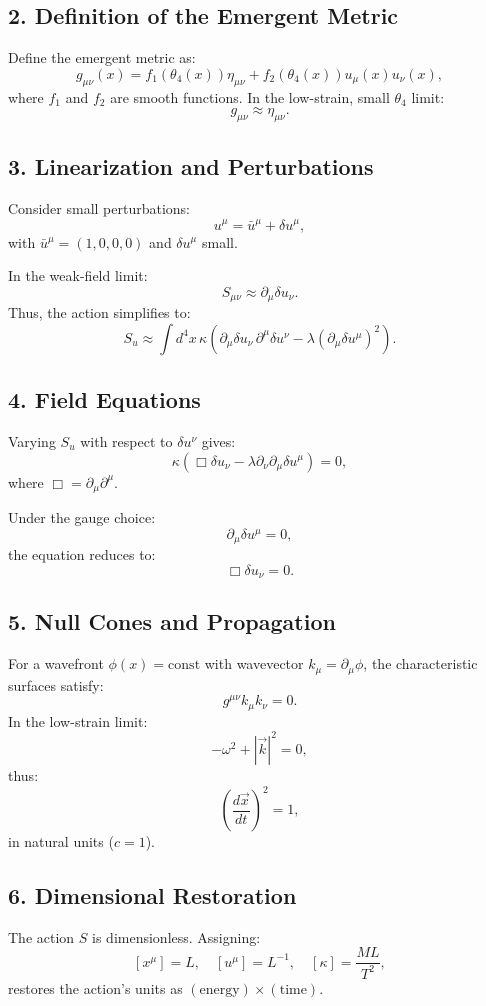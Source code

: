 \documentclass[12pt]{article}
\begin{document}
\subsection*{2. Definition of the Emergent Metric}
Define the emergent metric as:
\[
g_{\mu\nu}(x) = f_1(\theta_4(x)) \eta_{\mu\nu} + f_2(\theta_4(x)) u_\mu(x) u_\nu(x),
\]
where \(f_1\) and \(f_2\) are smooth functions. In the low-strain, small \(\theta_4\) limit:
\[
g_{\mu\nu} \approx \eta_{\mu\nu}.
\]

\subsection*{3. Linearization and Perturbations}
Consider small perturbations:
\[
u^\mu = \bar{u}^\mu + \delta u^\mu,
\]
with \(\bar{u}^\mu = (1, 0, 0, 0)\) and \(\delta u^\mu\) small.

In the weak-field limit:
\[
S_{\mu\nu} \approx \partial_\mu \delta u_\nu.
\]
Thus, the action simplifies to:
\[
S_u \approx \int d^4x \, \kappa \left( \partial_\mu \delta u_\nu \, \partial^\mu \delta u^\nu - \lambda (\partial_\mu \delta u^\mu)^2 \right).
\]

\subsection*{4. Field Equations}
Varying \(S_u\) with respect to \(\delta u^\nu\) gives:
\[
\kappa \left( \Box \delta u_\nu - \lambda \partial_\nu \partial_\mu \delta u^\mu \right) = 0,
\]
where \(\Box = \partial_\mu \partial^\mu\).

Under the gauge choice:
\[
\partial_\mu \delta u^\mu = 0,
\]
the equation reduces to:
\[
\Box \delta u_\nu = 0.
\]

\subsection*{5. Null Cones and Propagation}
For a wavefront \(\phi(x) = \text{const}\) with wavevector \(k_\mu = \partial_\mu \phi\), the characteristic surfaces satisfy:
\[
g^{\mu\nu} k_\mu k_\nu = 0.
\]
In the low-strain limit:
\[
-\omega^2 + |\vec{k}|^2 = 0,
\]
thus:
\[
\left( \frac{d\vec{x}}{dt} \right)^2 = 1,
\]
in natural units (\(c = 1\)).

\subsection*{6. Dimensional Restoration}
The action \(S\) is dimensionless. Assigning:
\[
[x^\mu] = L, \quad [u^\mu] = L^{-1}, \quad [\kappa] = \frac{ML}{T^2},
\]
restores the action's units as \((\text{energy}) \times (\text{time})\).
\end{document}
